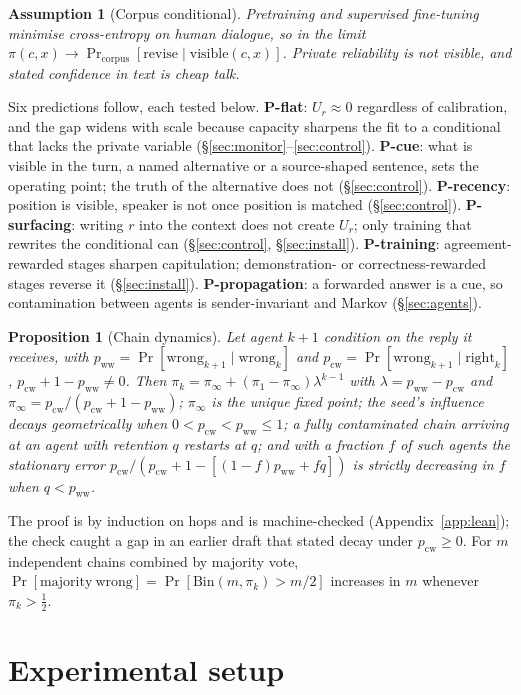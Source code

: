 \documentclass{article}
\newtheorem{proposition}{Proposition}
\newtheorem{assumption}{Assumption}
\newcommand{\Uz}[1]{U_{#1}}
\newcommand{\pww}{p_{\mathrm{ww}}}
\newcommand{\pcw}{p_{\mathrm{cw}}}
\newcommand{\piinf}{\pi_{\infty}}
\begin{document}
\begin{assumption}[Corpus conditional]\label{ass:corpus}
Pretraining and supervised fine-tuning minimise cross-entropy on human dialogue, so in the limit $\pi(c,x)\to\Pr_{\mathrm{corpus}}[\mathrm{revise}\mid\mathrm{visible}(c,x)]$. Private reliability is not visible, and stated confidence in text is cheap talk.
\end{assumption}
Six predictions follow, each tested below. \textbf{P-flat}: $\Uz{r}\approx0$ regardless of calibration, and the gap widens with scale because capacity sharpens the fit to a conditional that lacks the private variable (\S\ref{sec:monitor}--\ref{sec:control}). \textbf{P-cue}: what is visible in the turn, a named alternative or a source-shaped sentence, sets the operating point; the truth of the alternative does not (\S\ref{sec:control}). \textbf{P-recency}: position is visible, speaker is not once position is matched (\S\ref{sec:control}). \textbf{P-surfacing}: writing $r$ into the context does not create $\Uz{r}$; only training that rewrites the conditional can (\S\ref{sec:control}, \S\ref{sec:install}). \textbf{P-training}: agreement-rewarded stages sharpen capitulation; demonstration- or correctness-rewarded stages reverse it (\S\ref{sec:install}). \textbf{P-propagation}: a forwarded answer is a cue, so contamination between agents is sender-invariant and Markov (\S\ref{sec:agents}).

\begin{proposition}[Chain dynamics]\label{prop:chain}
Let agent $k{+}1$ condition on the reply it receives, with $\pww=\Pr[\mathrm{wrong}_{k+1}\mid\mathrm{wrong}_k]$ and $\pcw=\Pr[\mathrm{wrong}_{k+1}\mid\mathrm{right}_k]$, $\pcw+1-\pww\neq0$. Then $\pi_k=\piinf+(\pi_1-\piinf)\lambda^{k-1}$ with $\lambda=\pww-\pcw$ and $\piinf=\pcw/(\pcw+1-\pww)$; $\piinf$ is the unique fixed point; the seed's influence decays geometrically when $0<\pcw<\pww\le1$; a fully contaminated chain arriving at an agent with retention $q$ restarts at $q$; and with a fraction $f$ of such agents the stationary error $\pcw/(\pcw+1-[(1-f)\pww+fq])$ is strictly decreasing in $f$ when $q<\pww$.
\end{proposition}
The proof is by induction on hops and is machine-checked (Appendix~\ref{app:lean}); the check caught a gap in an earlier draft that stated decay under $\pcw\ge0$. For $m$ independent chains combined by majority vote, $\Pr[\mathrm{majority\ wrong}]=\Pr[\mathrm{Bin}(m,\pi_k)>m/2]$ increases in $m$ whenever $\pi_k>\tfrac12$.

\section{Experimental setup}\label{sec:setup}
\end{document}
